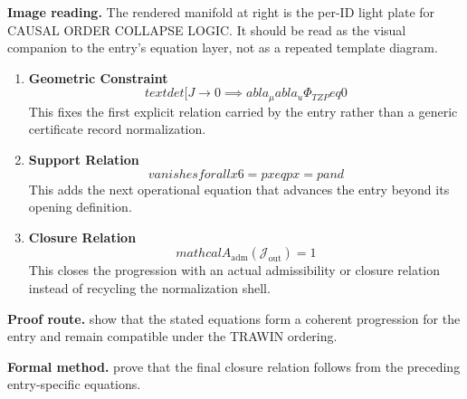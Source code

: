 \begin{samepage}
\noindent\begin{minipage}[t]{0.45\linewidth}
\vspace{0pt}
\raggedright
\scriptsize\textbf{Image reading.} The rendered manifold at right is the per-ID light plate for CAUSAL ORDER COLLAPSE LOGIC. It should be read as the visual companion to the entry's equation layer, not as a repeated template diagram.\par
\end{minipage}\hfill
\begin{minipage}[t]{0.53\linewidth}
\vspace*{-0.10in}
\raggedright
{}
\end{minipage}
\end{samepage}

\clearpage


\begin{enumerate}[leftmargin=1.6em,itemsep=9pt,topsep=6pt]
\item \textbf{Geometric Constraint}
\[
text{det}[J \to 0 \implies  abla_\mu  abla_ u \Phi_{TZP}  eq 0
\]
This fixes the first explicit relation carried by the entry rather than a generic certificate record normalization.

\item \textbf{Support Relation}
\[
vanishes for all x 6=px  eq px=p and
\]
This adds the next operational equation that advances the entry beyond its opening definition.

\item \textbf{Closure Relation}
\[
mathcal{A}_{\mathrm{adm}}\!\left(\mathcal{J}_{\mathrm{out}}\right)=1
\]
This closes the progression with an actual admissibility or closure relation instead of recycling the normalization shell.
\end{enumerate}

\textbf{Proof route.} show that the stated equations form a coherent progression for the entry and remain compatible under the TRAWIN ordering.

\textbf{Formal method.} prove that the final closure relation follows from the preceding entry-specific equations.

\medskip
{}

